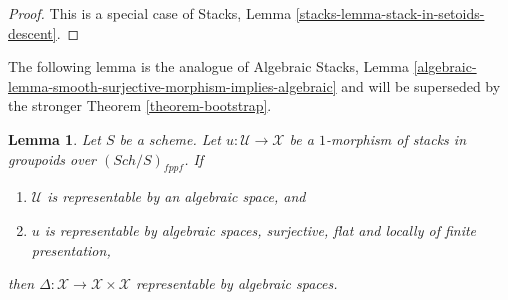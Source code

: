 \documentclass{stacks-project}
\theoremstyle{plain}
\newtheorem{lemma}[subsection]{Lemma}
\theoremstyle{definition}
\theoremstyle{remark}
\numberwithin{equation}{subsection}
\def\Sch{\mathit{Sch}}
\begin{document}
\begin{proof}
This is a special case of
Stacks, Lemma \ref{stacks-lemma-stack-in-setoids-descent}.
\end{proof}

\noindent
The following lemma is the analogue of
Algebraic Stacks, Lemma
\ref{algebraic-lemma-smooth-surjective-morphism-implies-algebraic}
and will be superseded by the stronger
Theorem \ref{theorem-bootstrap}.

\begin{lemma}
\label{lemma-flat-finite-presentation-surjective-diagonal}
Let $S$ be a scheme.
Let $u : \mathcal{U} \to \mathcal{X}$ be a $1$-morphism of
stacks in groupoids over $(\Sch/S)_{fppf}$. If
\begin{enumerate}
\item $\mathcal{U}$ is representable by an algebraic space, and
\item $u$ is representable by algebraic spaces, surjective, flat and
locally of finite presentation,
\end{enumerate}
then
$\Delta : \mathcal{X} \to \mathcal{X} \times \mathcal{X}$
representable by algebraic spaces.
\end{lemma}
\end{document}
